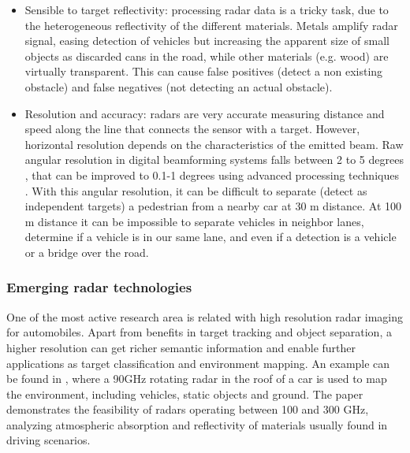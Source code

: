\begin{itemize}
    \item Sensible to target reflectivity: processing radar data is a tricky
    task, due to the heterogeneous reflectivity of the different materials. 
    Metals amplify radar signal, easing detection of vehicles but increasing
    the apparent size of small objects as discarded cans in the road, while 
    other materials (e.g. wood) are virtually transparent.
    This can cause false positives (detect a non existing obstacle) and false
    negatives (not detecting an actual obstacle).
    
    \item Resolution and accuracy: radars are very accurate measuring distance
    and speed along the line that connects the sensor with a target. However, 
    horizontal resolution depends on the characteristics of the emitted beam.
    Raw angular resolution in digital beamforming systems falls between 2 to 5
    degrees \cite{Schneider2005}, that can be improved to 0.1-1 degrees using 
    advanced 
    processing techniques \cite{Kissinger2012}. 
    With this angular resolution, it can be difficult to separate (detect as
    independent targets) a pedestrian from a nearby car at 30 m distance. 
    At 100 m distance it can be impossible to separate vehicles in neighbor
    lanes, determine if a vehicle is in our same lane, and even if a detection
    is a vehicle or a bridge over the road.
\end{itemize}

\subsubsection{Emerging radar technologies}

One of the most active research area is related with high resolution radar
imaging for automobiles. Apart from benefits in target tracking and object
separation, a higher resolution can get richer semantic information and enable
further applications as target classification and environment mapping. 
An example can be found in \cite{Reina2015}, where a 90GHz rotating radar in
the roof of a car is used to map the environment, including vehicles, static
objects and ground.
The paper \cite{Kohler2013} demonstrates the feasibility of radars operating
between 100 and 300 GHz, analyzing atmospheric absorption and reflectivity of
materials usually found in driving scenarios.


